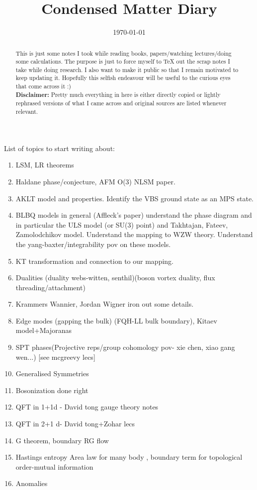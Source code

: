 \documentclass{article}
\title{Condensed Matter Diary}
\author{}
\date{\today}
\begin{document}
\maketitle
\begin{abstract}
    This is just some notes I took while reading books, papers/watching lectures/doing some calculations. The purpose is just to force myself to TeX out the scrap notes I take while doing research. I also want to make it public so that I remain motivated to keep updating it. Hopefully this selfish endeavour will be useful to the curious eyes that come across it :)\\
    \textbf{Disclaimer:} Pretty much everything in here is either directly copied or lightly rephrased versions of what I came across and original sources are listed whenever relevant.
\end{abstract}
List of topics to start writing about:
\begin{enumerate}
    \item LSM, LR theorems
    \item Haldane phase/conjecture, AFM O(3) NLSM paper.
    \item AKLT model and properties. Identify the VBS ground state as an MPS state.
    \item BLBQ models in general (Affleck's paper) understand the phase diagram and in particular the ULS model (or SU(3) point) and Takhtajan, Fateev, Zamolodchikov model. Understand the mapping to WZW theory. Understand the yang-baxter/integrability pov on these models.
    \item KT transformation and connection to our mapping.
    \item Dualities (duality webs-witten, senthil)(boson vortex duality, flux threading/attachment)
    \item Krammers Wannier, Jordan Wigner iron out some details.
    \item Edge modes (gapping the bulk) (FQH-LL bulk boundary), Kitaev model+Majoranas
    \item SPT phases(Projective reps/group cohomology pov- xie chen, xiao gang wen...) [see mcgreevy lecs]
    \item Generalised Symmetries
    \item Bosonization done right
    \item QFT in 1+1d - David tong gauge theory notes
    \item QFT in 2+1 d- David tong+Zohar lecs
    \item G theorem, boundary RG flow
    \item Hastings entropy Area law for many body , boundary term for topological order-mutual information
    \item Anomalies 
\end{enumerate}
\end{document}
